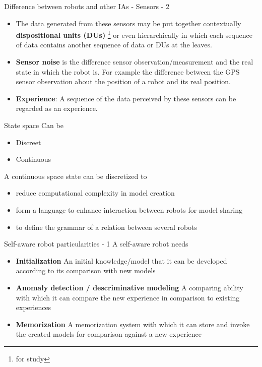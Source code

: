 \documentclass[unknownkeysallowed]{beamer}
\begin{document}
	\begin{frame}{Difference between robots and other IAs - Sensors - 2}
		\begin{itemize}
			\item The data generated from these sensors may be put together contextually \textbf{dispositional units (DUs)} \footnote{ for study} or even hierarchically in which each sequence of data contains another sequence of data or DUs at the leaves.
			\item \textbf{Sensor noise} is the difference sensor observation/measurement and the real state in which the robot is. For example the difference between the GPS sensor observation about the position of a robot and its real position. 
			\item \textbf{Experience}: A sequence of the data perceived by these sensors can be regarded as an experience.
		\end{itemize}
	\end{frame}

	\begin{frame}{State space}
		Can be 
		\begin{itemize}
			\item Discreet
			\item Continuous
		\end{itemize}
	   A continuous space state can be discretized to
		\begin{itemize}
			\item reduce computational complexity in model creation
			\item form a language to enhance interaction between robots for model sharing
			\item to define the grammar of a relation between several robots
		\end{itemize}
	\end{frame}

	\begin{frame}{Self-aware robot particularities - 1}
		A self-aware robot needs 
		\begin{itemize}
			\item \textbf{Initialization} An initial knowledge/model that it can be developed according to its comparison with new models
			\item \textbf{Anomaly detection / descriminative modeling} A comparing ability with which it can compare the new experience in comparison to existing experiences
			\item \textbf{Memorization} A memorization system with which it can store and invoke the created models for comparison against a new experience
		\end{itemize}
	\end{frame}
\end{document}
